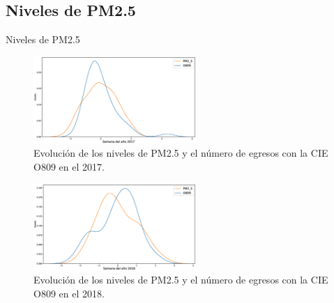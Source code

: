 \documentclass[11pt]{beamer}
\begin{document}
\subsection{Niveles de PM2.5}
\begin{frame}{Niveles de PM2.5}
\begin{multicols}{2}
\begin{figure}[h!]
\begin{center}
   \includegraphics[trim=100 0 0 0,clip,width=0.55\textwidth]{PM2_5_O809_2017.eps}
   \end{center}
    \caption[Series de tiempo 2017 PM2.5 y O809]{Evolución de los niveles de PM2.5 y el número de egresos con la CIE O809 en el 2017.}
    \label{serie_de_tiempo_2017_PM25}
\end{figure}
\begin{figure}[h!]
\begin{center}
   \includegraphics[trim=100 0 0 0,clip,width=0.55\textwidth]{PM2_5_O809_2018.eps}
   \end{center}
    \caption[Series de tiempo 2018 PM2.5 y O809]{Evolución de los niveles de PM2.5 y el número de egresos con la CIE O809 en el 2018.}
    \label{serie_de_tiempo_2018_PM25}
\end{figure}
\end{multicols}
\end{frame}
\end{document}
